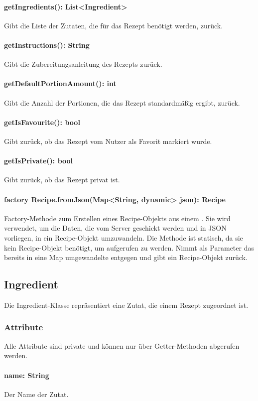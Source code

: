 \documentclass[parskip=full]{scrartcl}
\begin{document}
\paragraph{getIngredients(): List<Ingredient>}
Gibt die Liste der Zutaten, die für das Rezept benötigt werden, zurück.
\paragraph{getInstructions(): String}
Gibt die Zubereitungsanleitung des Rezepts zurück.
\paragraph{getDefaultPortionAmount(): int}
Gibt die Anzahl der Portionen, die das Rezept standardmäßig ergibt, zurück.
\paragraph{getIsFavourite(): bool}
Gibt zurück, ob das Rezept vom Nutzer als Favorit markiert wurde.
\paragraph{getIsPrivate(): bool}
Gibt zurück, ob das Rezept privat ist.
\paragraph{factory Recipe.fromJson(Map<String, dynamic> json): Recipe}
Factory-Methode zum Erstellen eines Recipe-Objekts aus einem . Sie wird verwendet, um die Daten, die vom Server geschickt werden und in \Gls{JSON} vorliegen, in ein Recipe-Objekt umzuwandeln. Die Methode ist statisch, da sie kein Recipe-Objekt benötigt, um aufgerufen zu werden. Nimmt als Parameter das bereits in eine Map umgewandelte  entgegen und gibt ein Recipe-Objekt zurück.

\subsection{Ingredient}
Die Ingredient-Klasse repräsentiert eine Zutat, die einem Rezept zugeordnet ist.
\subsubsection{Attribute}
Alle Attribute sind private und können nur über Getter-Methoden abgerufen werden.
\paragraph{name: String}
Der Name der Zutat.
\end{document}
